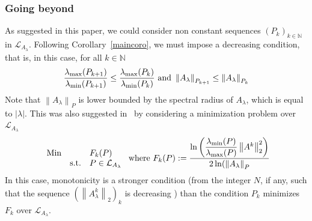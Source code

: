 \documentclass{article}
\def\norm#1{\left\|#1\right\|}
\def\nn{\mathbb N}
\def\lmax#1{\lambda_{\rm max}(#1)}
\def\lmin#1{\lambda_{\rm min}(#1)}
\def\red#1{#1}
\begin{document}
		\subsubsection{Going beyond}
		As suggested in this paper, we could consider non constant sequences $(P_k)_{k\in\nn}$ in $\mathcal{L}_{A_\lambda}$. Following Corollary~\ref{maincoro}, we must impose \red{a} decreasing condition, that is, in this case, for all $k\in\nn$ 
		\[
		\dfrac{\lmax{P_{k+1}}}{\lmin{P_{k+1}}}\leq \dfrac{\lmax{P_{k}}}{\lmin{P_{k}}}\text{ and } \norm{A_\lambda}_{P_{k+1}}\leq \norm{A_\lambda}_{P_{k}}
		\]
		Note that $\norm{A_\lambda}_P$ is lower bounded by the spectral radius of $A_\lambda$, which is equal to $|\lambda|$. This was also suggested in~\cite{adje13052025} by considering a minimization problem over $\mathcal{L}_{A_\lambda}$
		\[
		\begin{array}{rcl}
			\operatorname{Min} & & F_k(P) \\  
			& \text{s.t.} & P\in\mathcal{L}_{A_\lambda}
		\end{array}
		\text{ where } F_k(P):=\dfrac{\ln\left(\dfrac{\lmin{P}}{\lmax{P}}\norm{A^k}_2^2\right)}{2\ln(\norm{A_\lambda}_P}
		\]
		In this case, monotonicity is a stronger condition  (from the integer $N$, if any, such that the sequence $(\norm{A_\lambda^k}_2)_k$ is decreasing ) \red{than} the condition $P_k$ minimizes $F_k$ over $\mathcal{L}_{A_\lambda}$.   
		
		
		
		
		
	
\end{document}
